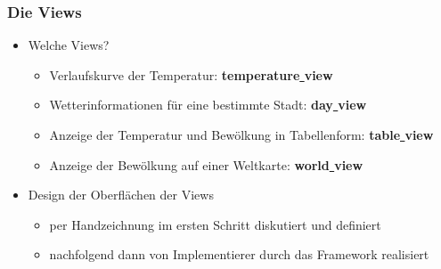 \begin{frame}
  \frametitle{Die Views}
  \begin{itemize}
    \item Welche Views?
    \begin{itemize}
      \item Verlaufskurve der Temperatur: \textbf{temperature\underline{ }view}
      \item Wetterinformationen f\"ur eine bestimmte Stadt: \textbf{day\underline{ }view}
      \item Anzeige der Temperatur und Bew\"olkung in Tabellenform: \textbf{table\underline{ }view}
      \item Anzeige der Bew\"olkung auf einer Weltkarte: \textbf{world\underline{ }view}
    \end{itemize}
    \item Design der Oberfl\"achen der Views
    \begin{itemize}
      \item per Handzeichnung im ersten Schritt diskutiert und definiert
      \item nachfolgend dann von Implementierer durch das Framework realisiert
    \end{itemize}
  \end{itemize}
\end{frame}
